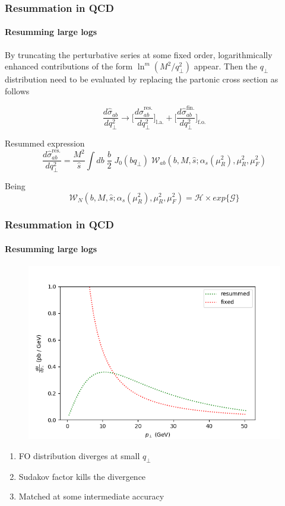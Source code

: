 \documentclass[aspectratio=43]{beamer}
\begin{document}
\begin{frame}

	\frametitle{Resummation in QCD}
	\framesubtitle{Resumming large logs}

	By truncating the perturbative series at some fixed order, logarithmically enhanced contributions of the form $\ln^{m}(M^{2}/q_{\perp}^{2})$ appear. Then the $q_{\perp}$ distribution need to be evaluated by replacing the partonic cross section as follows
	
	\begin{equation}
		\frac{d\hat{\sigma}_{ab}}{dq_{\perp}^{2}} \rightarrow 
		\Bigg[ \frac{d\hat{\sigma}^{\textrm{res.}}_{ab}}{dq_{\perp}^{2}} \Bigg]_{\textrm{l.a.}} + 
		\Bigg[ \frac{d\hat{\sigma}^{\textrm{fin.}}_{ab}}{dq_{\perp}^{2}} \Bigg]_{\textrm{f.o.}} \nonumber
	\end{equation}

	Resummed expression 
	\begin{equation}
		\frac{d\hat{\sigma}_{ab}^{\textrm{res.}}}{dq_{\perp}^{2}} = \frac{M^{2}}{\hat{s}} \int db \; \frac{b}{2} \; J_{0}(b q_{\perp}) \; \mathcal{W}_{ab}(b, M, \hat{s}; \alpha_{s}(\mu_{R}^{2}), \mu_{R}^{2}, \mu_{F}^{2}) \nonumber
	\end{equation}
	
	Being
	\begin{equation}
		\mathcal{W}_{N}(b, M, \hat{s}; \alpha_{s}(\mu_{R}^{2}), \mu_{R}^{2}, \mu_{F}^{2}) = \mathcal{H} \times exp\{\mathcal{G}\} \nonumber
	\end{equation}

\end{frame}

\begin{frame}

	\frametitle{Resummation in QCD}
	\framesubtitle{Resumming large logs}
		
		\begin{figure}[!htb]
			\includegraphics[width = 6 cm]{plots/resummed.png}
		\end{figure}
		
		\begin{enumerate}
			\item FO distribution diverges at small $q_{\perp}$
			\item Sudakov factor kills the divergence
			\item Matched at some intermediate accuracy
		\end{enumerate}

\end{frame}
\end{document}
